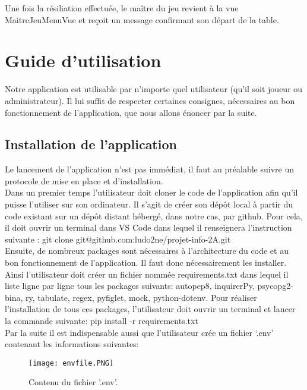 \documentclass[11pt]{article}
\begin{document}
Une fois la résiliation effectuée, le maître du jeu revient à la vue MaitreJeuMenuVue et reçoit un message confirmant son départ de la table.



\newpage
\section{Guide d'utilisation}

Notre application est utilisable par n'importe quel utilisateur (qu’il soit joueur ou administrateur). Il lui suffit de respecter certaines consignes, nécessaires au bon fonctionnement de l’application, que nous allons énoncer par la suite. 

\subsection{Installation de l'application}
Le lancement de l'application n'est pas immédiat, il faut au préalable suivre un protocole de mise en place et d’installation. \\

Dans un premier temps l’utilisateur doit cloner le code de l’application afin qu’il puisse l’utiliser sur son ordinateur. Il s’agit de créer son dépôt local à partir du code existant sur un dépôt distant hébergé, dans notre cas, par github.
Pour cela, il doit ouvrir un terminal dans VS Code dans lequel il renseignera l’instruction suivante : git clone git@github.com:ludo2ne/projet-info-2A.git \\

Ensuite, de nombreux packages sont nécessaires à l’architecture du code et au bon fonctionnement de l’application. Il faut donc nécessairement les installer. Ainsi l'utilisateur doit créer un fichier nommée requirements.txt dans lequel il liste ligne par ligne tous les packages suivants: autopep8, inquirerPy, psycopg2-bina, ry, tabulate, regex, pyfiglet, mock, python-dotenv. Pour réaliser l’installation de tous ces packages, l’utilisateur doit ouvrir un terminal et lancer la commande suivante: pip install -r requirements.txt \\

Par la suite il est indispensable aussi que l'utilisateur crée un fichier ‘.env’ contenant les informations suivantes: 

\begin{figure}[h]
\centering
\texttt{[image: envfile.PNG]}
\caption{
Contenu du fichier '.env'.}
\end{figure}
\end{document}
